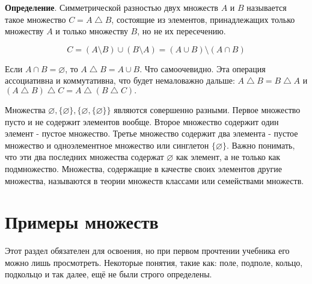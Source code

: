 \documentclass[a4paper]{book}
\begin{document}
\textbf{Определение}. Симметрической разностью двух множеств $A$ и $B$ называется такое множество $C = A\bigtriangleup B$, состоящие из элементов, принадлежащих только множеству $A$ и только множеству $B$, но не их пересечению. 

\begin{equation}
C = (A\setminus B)\cup(B\setminus A) = (A\cup B)\setminus (A\cap B)
\end{equation}

Если $A\cap B = \varnothing$, то $A\bigtriangleup B = A \cup B$. Что самоочевидно. Эта операция ассоциативна и коммутативна, что будет немаловажно дальше: $A\bigtriangleup B = B \bigtriangleup A$ и $(A\bigtriangleup B)\bigtriangleup C = A\bigtriangleup (B\bigtriangleup C).$

Множества $\varnothing, \{\varnothing\}, \{\varnothing, \{\varnothing\}\}$ являются совершенно разными. Первое множество пусто и не содержит элементов вообще. Второе множество содержит один элемент - пустое множество. Третье множество содержит два элемента - пустое множество и одноэлементное множество или синглетон $\{\varnothing\}$. Важно понимать, что эти два последних множества содержат $\varnothing$ как элемент, а не только как подмножество. Множества, содержащие в качестве своих элементов другие множества, называются в теории множеств классами или семействами множеств. 

\section{Примеры множеств}

Этот раздел обязателен для освоения, но при первом прочтении учебника его можно лишь просмотреть. Некоторые понятия, такие как: поле, подполе, кольцо, подкольцо и так далее, ещё не были строго определены.
\end{document}
